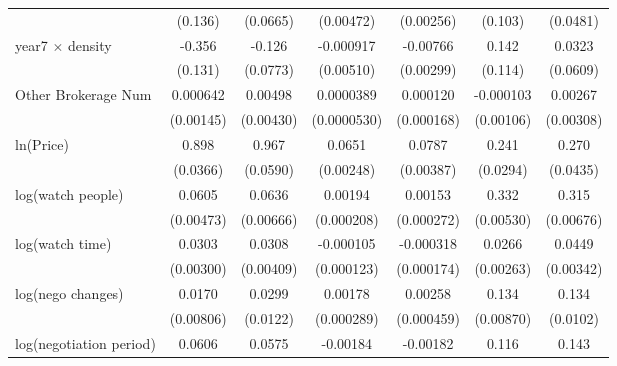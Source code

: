 {\begin{tabular}{l*{6}{c}}
            &     (0.136)         &    (0.0665)         &   (0.00472)         &   (0.00256)         &     (0.103)         &    (0.0481)         \\
\addlinespace
year7 $\times$ density&      -0.356\sym{***}&      -0.126         &   -0.000917         &    -0.00766\sym{**} &       0.142         &      0.0323         \\
            &     (0.131)         &    (0.0773)         &   (0.00510)         &   (0.00299)         &     (0.114)         &    (0.0609)         \\
\addlinespace
Other Brokerage Num  &    0.000642         &     0.00498         &   0.0000389         &    0.000120         &   -0.000103         &     0.00267         \\
            &   (0.00145)         &   (0.00430)         & (0.0000530)         &  (0.000168)         &   (0.00106)         &   (0.00308)         \\
\addlinespace
ln(Price)&       0.898\sym{***}&       0.967\sym{***}&      0.0651\sym{***}&      0.0787\sym{***}&       0.241\sym{***}&       0.270\sym{***}\\
            &    (0.0366)         &    (0.0590)         &   (0.00248)         &   (0.00387)         &    (0.0294)         &    (0.0435)         \\
\addlinespace
log(watch people)&      0.0605\sym{***}&      0.0636\sym{***}&     0.00194\sym{***}&     0.00153\sym{***}&       0.332\sym{***}&       0.315\sym{***}\\
            &   (0.00473)         &   (0.00666)         &  (0.000208)         &  (0.000272)         &   (0.00530)         &   (0.00676)         \\
\addlinespace
log(watch time)&      0.0303\sym{***}&      0.0308\sym{***}&   -0.000105         &   -0.000318\sym{*}  &      0.0266\sym{***}&      0.0449\sym{***}\\
            &   (0.00300)         &   (0.00409)         &  (0.000123)         &  (0.000174)         &   (0.00263)         &   (0.00342)         \\
\addlinespace
log(nego changes)&      0.0170\sym{**} &      0.0299\sym{**} &     0.00178\sym{***}&     0.00258\sym{***}&       0.134\sym{***}&       0.134\sym{***}\\
            &   (0.00806)         &    (0.0122)         &  (0.000289)         &  (0.000459)         &   (0.00870)         &    (0.0102)         \\
\addlinespace
log(negotiation period)&      0.0606\sym{***}&      0.0575\sym{***}&    -0.00184\sym{***}&    -0.00182\sym{***}&       0.116\sym{***}&       0.143\sym{***}\\

\end{tabular}}
